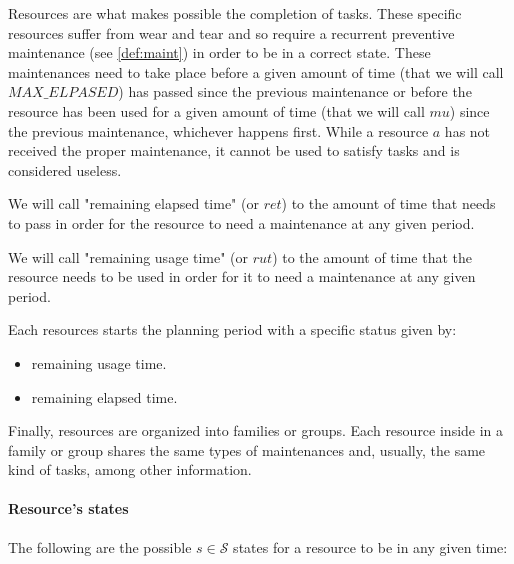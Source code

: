 \documentclass{roadef}
\begin{document}
    Resources are what makes possible the completion of tasks. These specific resources suffer from wear and tear and so require a recurrent preventive maintenance (see \ref{def:maint}) in order to be in a correct state. These maintenances need to take place before a given amount of time (that we will call $MAX\_ELPASED$) has passed since the previous maintenance or before the resource has been used for a given amount of time (that we will call $mu$) since the previous maintenance, whichever happens first. While a resource $a$ has not received the proper maintenance, it cannot be used to satisfy tasks and is considered useless.

    We will call "remaining elapsed time" (or $ret$) to the amount of time that needs to pass in order for the resource to need a maintenance at any given period.

    We will call "remaining usage time" (or $rut$) to the amount of time that the resource needs to be used in order for it to need a maintenance at any given period.


    Each resources starts the planning period with a specific status given by:

    \begin{itemize}
        \item remaining usage time.
        \item remaining elapsed time.
    \end{itemize}

    Finally, resources are organized into families or groups. Each resource inside in a family or group shares the same types of maintenances and, usually, the same kind of tasks, among other information.

    \paragraph{Resource's states}
    \label{def:res-state}

    The following are the possible $s \in \mathcal{S}$ states for a resource to be in any given time:
\end{document}

